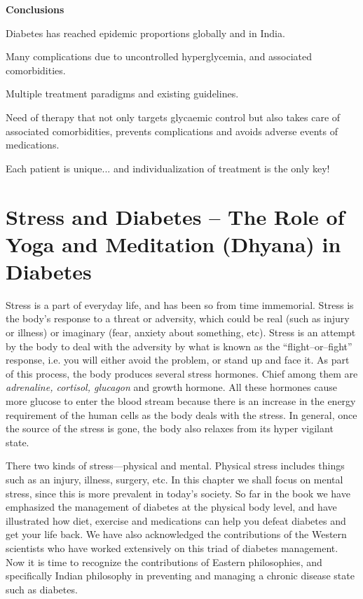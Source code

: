 \textbf{Conclusions}

\item Diabetes has reached epidemic proportions globally and in India.

 \item Many complications due to uncontrolled hyperglycemia, and associated comorbidities.

 \item Multiple treatment paradigms and existing guidelines.

 \item Need of therapy that not only targets glycaemic control but also takes care of associated comorbidities, prevents complications and avoids adverse events of medications.

 \item Each patient is unique... and individualization of treatment is the only key!


\chapter{Stress and Diabetes – The Role of Yoga and Meditation (Dhyana) in Diabetes}

Stress is a part of everyday life, and has been so from time immemorial. Stress is the body’s response to a threat or adversity, which could be real (such as injury or illness) or imaginary (fear, anxiety about something, etc). Stress is an attempt by the body to deal with the adversity by what is known as the “flight–or–fight” response, i.e. you will either avoid the problem, or stand up and face it. As part of this process, the body produces several stress hormones. Chief among them are \textit{adrenaline, cortisol, glucagon} and growth hormone. All these hormones cause more glucose to enter the blood stream because there is an increase in the energy requirement of the human cells as the body deals with the stress. In general, once the source of the stress is gone, the body also relaxes from its hyper vigilant state.

There two kinds of stress—physical and mental. Physical stress includes things such as an injury, illness, surgery, etc. In this chapter we shall focus on mental stress, since this is more prevalent in today’s society. So far in the book we have emphasized the management of diabetes at the physical body level, and have illustrated how diet, exercise and medications can help you defeat diabetes and get your life back. We have also acknowledged the contributions of the Western scientists who have worked extensively on this triad of diabetes management. Now it is time to recognize the contributions of Eastern philosophies, and specifically Indian philosophy in preventing and managing a chronic disease state such as diabetes.

